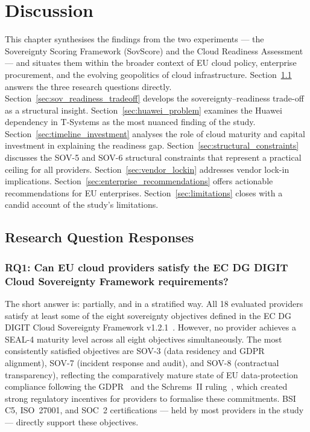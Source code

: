 \chapter{Discussion}
\label{ch:discussion}

This chapter synthesises the findings from the two experiments — the Sovereignty Scoring Framework (SovScore) and the Cloud Readiness Assessment — and situates them within the broader context of EU cloud policy, enterprise procurement, and the evolving geopolitics of cloud infrastructure. Section~\ref{sec:rq_responses} answers the three research questions directly. Section~\ref{sec:sov_readiness_tradeoff} develops the sovereignty–readiness trade-off as a structural insight. Section~\ref{sec:huawei_problem} examines the Huawei dependency in T-Systems as the most nuanced finding of the study. Section~\ref{sec:timeline_investment} analyses the role of cloud maturity and capital investment in explaining the readiness gap. Section~\ref{sec:structural_constraints} discusses the SOV-5 and SOV-6 structural constraints that represent a practical ceiling for all providers. Section~\ref{sec:vendor_lockin} addresses vendor lock-in implications. Section~\ref{sec:enterprise_recommendations} offers actionable recommendations for EU enterprises. Section~\ref{sec:limitations} closes with a candid account of the study's limitations.

\section{Research Question Responses}
\label{sec:rq_responses}

\subsection{RQ1: Can EU cloud providers satisfy the EC DG DIGIT Cloud Sovereignty Framework requirements?}

The short answer is: partially, and in a stratified way. All 18 evaluated providers satisfy at least some of the eight sovereignty objectives defined in the EC DG DIGIT Cloud Sovereignty Framework v1.2.1~\cite{EC_DIGIT_CloudSovereignty_2025}. However, no provider achieves a SEAL-4 maturity level across all eight objectives simultaneously. The most consistently satisfied objectives are SOV-3 (data residency and GDPR alignment), SOV-7 (incident response and audit), and SOV-8 (contractual transparency), reflecting the comparatively mature state of EU data-protection compliance following the GDPR~\cite{GDPR2016} and the Schrems~II ruling~\cite{SchremsII_2020}, which created strong regulatory incentives for providers to formalise these commitments. BSI C5, ISO~27001, and SOC~2 certifications — held by most providers in the study — directly support these objectives.

